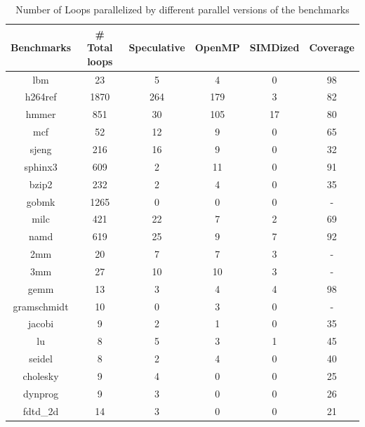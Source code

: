 \documentclass[10pt]{report}          %
\begin{document}
\begin{table}[h]
\centering
\caption{Number of Loops parallelized by different parallel versions of the benchmarks}
\begin{tabular}{|c||c|c|c|c|c|} \hline
Benchmarks & \# Total loops & Speculative & OpenMP & SIMDized & Coverage \\ \hline
lbm & 23 & 5 & 4  &	0 & 98\\ \hline
h264ref & 1870 & 264 & 179 & 3 & 82 \\ \hline
hmmer &	 851	 & 30 & 105 & 17 & 80 \\ \hline
mcf & 52 & 12 & 9 & 0 & 65 \\ \hline
sjeng &	216 & 16	 & 9 & 0 & 32 \\ \hline
sphinx3 & 609 & 2 & 11 & 0 & 91 \\ \hline
bzip2 & 232 & 2 & 4 & 0 & 35 \\ \hline
gobmk & 1265 & 0 & 0 & 0 & - \\ \hline
milc & 421 & 22 & 7 & 2 & 69 \\ \hline
namd & 619 & 25 & 9 & 7 & 92 \\ \hline	
2mm	&20& 7 &7 & 3 & - \\ \hline
3mm	&27& 10&10 & 3 & - \\ \hline	
gemm & 13 & 3 & 4 & 4 & 98 \\ \hline
gramschmidt & 10 & 0 & 3 & 0 & - \\ \hline
jacobi & 9 & 2 & 1 & 0 & 35 \\ \hline
lu & 8 & 5 & 3 & 1 & 45 \\ \hline
seidel & 8 & 2 & 4 & 0 & 40 \\ \hline	
cholesky & 9 & 4 & 0 & 0 & 25 \\ \hline
dynprog & 9 & 3 & 0 & 0 & 26 \\ \hline
fdtd\_2d & 14 & 3 & 0 & 0 & 21 \\ \hline
\hline\end{tabular}
\label{table:coverage_2}
\end{table}
\end{document}
